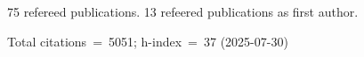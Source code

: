 75 refereed publications. 13 refeered publications as first author.

Total citations~=~5051; h-index~=~37 (2025-07-30)